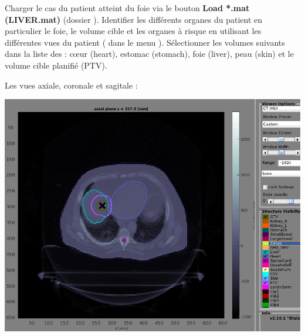 \documentclass[a4paper,12pt,notitlepage]{article}	%
\begin{document}
\begin{questions}
  
\question Charger le cas du patient atteint du foie via le bouton \textbf{Load *.mat (LIVER.mat)} (dossier ). Identifier les différents organes du patient en particulier le foie, le volume cible et les organes à risque en utilisant les différentes vues du patient ( dans le menu \textbf{}). Sélectionner les volumes suivants dans la liste des  :  c\oe ur (heart), estomac (stomach), foie (liver), peau (skin) et le volume cible planifié (PTV).

\begin{reponse}
	Les vues axiale, coronale et sagitale :
	
  \includegraphics[height=.2\textheight]{./Figures/LiverAxial} \quad 

\end{reponse}
\end{questions}
\end{document}
